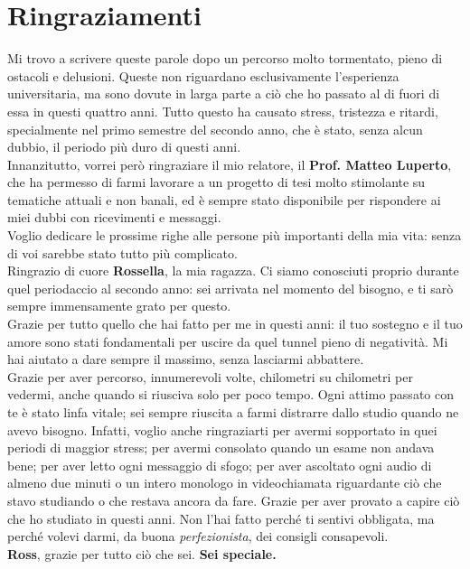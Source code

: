 \chapter*{Ringraziamenti}
\label{chap:ack}
Mi trovo a scrivere queste parole dopo un percorso molto tormentato, pieno di ostacoli e delusioni.
Queste non riguardano esclusivamente l'esperienza universitaria, ma sono dovute in larga parte a ciò
che ho passato al di fuori di essa in questi quattro anni. 
Tutto questo ha causato stress, tristezza e ritardi, specialmente nel primo semestre del secondo anno, 
che è stato, senza alcun dubbio, il periodo più duro di questi anni.\\
\noindent Innanzitutto, vorrei però ringraziare il mio relatore, il \textbf{Prof. Matteo Luperto}, che ha permesso di
farmi lavorare a un progetto di tesi molto stimolante su tematiche attuali e non banali, ed è sempre
stato disponibile per rispondere ai miei dubbi con ricevimenti e messaggi. \\ 

\noindent Voglio dedicare le prossime righe alle persone più importanti della mia vita:
senza di voi sarebbe stato tutto più complicato. \\

\noindent Ringrazio di cuore \textbf{Rossella}, la mia ragazza.
Ci siamo conosciuti proprio durante quel periodaccio al secondo anno: sei arrivata nel momento del bisogno, e ti sarò sempre immensamente grato per questo. \\
\noindent Grazie per tutto quello che hai fatto per me in questi anni: il tuo sostegno e il tuo amore sono 
stati fondamentali per uscire da quel tunnel pieno di negatività. 
Mi hai aiutato a dare sempre il massimo, senza lasciarmi abbattere.\\ %
\noindent Grazie per aver percorso, innumerevoli volte, chilometri su chilometri per vedermi,
anche quando si riusciva solo per poco tempo. Ogni attimo passato con te è stato linfa vitale; sei 
sempre riuscita a farmi distrarre dallo studio quando ne avevo bisogno.
Infatti, voglio anche ringraziarti per avermi sopportato in quei periodi di maggior stress; 
per avermi consolato quando un esame non andava bene; per aver letto ogni messaggio di sfogo; per aver 
ascoltato ogni audio di almeno due minuti o un intero monologo in videochiamata riguardante ciò che 
stavo studiando o che restava ancora da fare.
Grazie per aver provato a capire ciò che ho studiato in questi anni. Non l'hai fatto perché ti 
sentivi obbligata, ma perché volevi darmi, da buona \textit{perfezionista}, dei consigli consapevoli.\\
\textbf{Ross}, grazie per tutto ciò che sei. \textbf{Sei speciale.} \\

